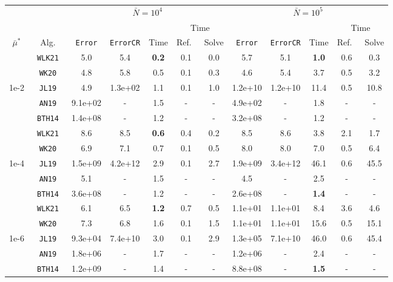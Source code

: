 \begin{tabular}{ccccccc|ccccc}%
\toprule
& & \multicolumn{5}{c}{$\bar N = 10^4$} & \multicolumn{5}{c}{$\bar N = 10^5$} \\
\cmidrule(lr){3-7} \cmidrule(lr){8-12}
& & & & & \multicolumn{2}{c}{Time} & & & & \multicolumn{2}{c}{Time} \\
\cmidrule(lr){6-7} \cmidrule(lr){11-12}
$\bar\mu^*$   & Alg.        & \texttt{Error} & \texttt{ErrorCR} & Time      & Ref.\ & Solve & \texttt{Error} & \texttt{ErrorCR} & Time     & Ref.\  & Solve \\
\midrule
& \texttt{ WLK21 }&  5.0&  5.4& \textbf{ 0.2 }&  0.1&  0.0&  5.7&  5.1& \textbf{ 1.0 }&  0.6&  0.3 \\
& \texttt{ WK20 }&  4.8&  5.8&  0.5&  0.1&  0.3&  4.6&  5.4&  3.7&  0.5&  3.2 \\
1e-2& \texttt{ JL19 }&  4.9&  1.3e+02&  1.1&  0.1&  1.0&  1.2e+10&  1.2e+10&  11.4&  0.5&  10.8 \\
& \texttt{ AN19 }&  9.1e+02& -&  1.5& -& -&  4.9e+02& -&  1.8& -& - \\
& \texttt{ BTH14 }&  1.4e+08& -&  1.2& -& -&  3.2e+08& -&  1.2& -& - \\
\midrule
& \texttt{ WLK21 }&  8.6&  8.5& \textbf{ 0.6 }&  0.4&  0.2&  8.5&  8.6&  3.8&  2.1&  1.7 \\
& \texttt{ WK20 }&  6.9&  7.1&  0.7&  0.1&  0.5&  8.0&  8.0&  7.0&  0.5&  6.4 \\
1e-4& \texttt{ JL19 }&  1.5e+09&  4.2e+12&  2.9&  0.1&  2.7&  1.9e+09&  3.4e+12&  46.1&  0.6&  45.5 \\
& \texttt{ AN19 }&  5.1& -&  1.5& -& -&  4.5& -&  2.5& -& - \\
& \texttt{ BTH14 }&  3.6e+08& -&  1.2& -& -&  2.6e+08& -& \textbf{ 1.4 }& -& - \\
\midrule
& \texttt{ WLK21 }&  6.1&  6.5& \textbf{ 1.2 }&  0.7&  0.5&  1.1e+01&  1.1e+01&  8.4&  3.6&  4.6 \\
& \texttt{ WK20 }&  7.3&  6.8&  1.6&  0.1&  1.5&  1.1e+01&  1.1e+01&  15.6&  0.5&  15.1 \\
1e-6& \texttt{ JL19 }&  9.3e+04&  7.4e+10&  3.0&  0.1&  2.9&  1.3e+05&  7.1e+10&  46.0&  0.6&  45.4 \\
& \texttt{ AN19 }&  1.8e+06& -&  1.7& -& -&  1.2e+06& -&  2.4& -& - \\
& \texttt{ BTH14 }&  1.2e+09& -&  1.4& -& -&  8.8e+08& -& \textbf{ 1.5 }& -& - \\
\bottomrule
\end{tabular}
